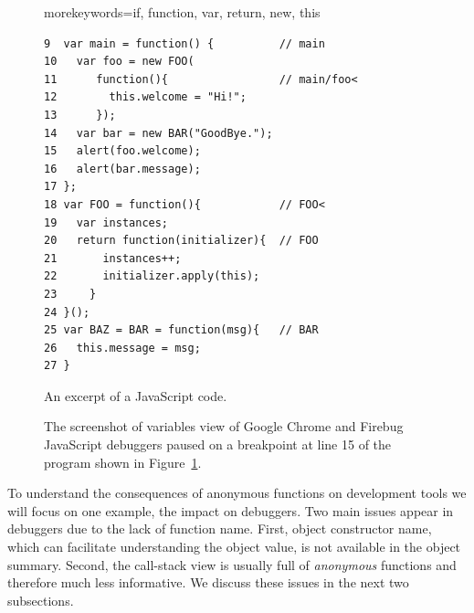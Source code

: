\documentclass[10pt, preprint]{sigplanconf}
\begin{document}
\begin{figure}[htp]

\lstset{basicstyle=\scriptsize}
{morekeywords={if, function, var, return, new, this}}

\begin{lstlisting}[frame=single, language=myLang]
9  var main = function() {          // main
10   var foo = new FOO(            
11      function(){                 // main/foo<
12        this.welcome = "Hi!";
13      });
14   var bar = new BAR("GoodBye.");
15   alert(foo.welcome);
16   alert(bar.message);
17 };
18 var FOO = function(){            // FOO<    
19   var instances;
20   return function(initializer){  // FOO
21       instances++;         
22       initializer.apply(this);
23     }
24 }();
25 var BAZ = BAR = function(msg){   // BAR
26   this.message = msg;
27 }
\end{lstlisting}
\caption{An excerpt of a JavaScript code.}
\label{js-code}
\end{figure}


\begin{figure}[htp]
\centerline{
\hfil
{}}
\caption{The screenshot of variables view of Google Chrome and Firebug JavaScript debuggers paused on a breakpoint at line 15 of the program shown in Figure~\ref{js-code}.}
\label{debuggers-objects}
\end{figure}

To understand the consequences of anonymous functions on development tools we will focus on one example, the impact on debuggers.
Two main issues appear in debuggers due to the lack of function name. First, object constructor name, which can facilitate understanding the object value, is not available in the object summary. Second, the call-stack view is usually full of \textit{anonymous} functions and therefore much less informative. We discuss these issues in the next two subsections. 
 
\end{document}
